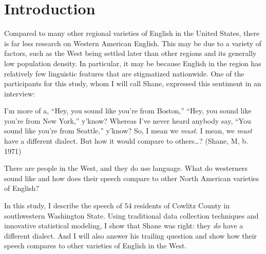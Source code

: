 \chapter{Introduction}
\label{ch:introduction}


Compared to many other regional varieties of English in the United States, there is far less research on Western American English. This may be due to a variety of factors, such as the West being settled later than other regions and its generally low population density. In particular, it may be because English in the region has relatively few linguistic features that are stigmatized nationwide. One of the participants for this study, whom I will call Shane, expressed this sentiment in an interview:
\begin{num_quote}
    I'm more of a, ``Hey, you sound like you're from Boston,'' ``Hey, you sound like you're from New York,'' y'know? Whereas I've never heard anybody say, ``You sound like you're from Seattle,'' y'know? So, I mean we \textit{must}. I mean, we \textit{must} have a different dialect. But how it would compare to others\ldots? (Shane, M, b. 1971)
\end{num_quote}
There are people in the West, and they do use language. What do westerners sound like and how does their speech compare to other North American varieties of English?

In this study, I describe the speech of 54 residents of Cowlitz County in southwestern Washington State. Using traditional data collection techniques and innovative statistical modeling, I show that Shane was right: they \textit{do} have a different dialect. And I will also answer his trailing question and show how their speech compares to other varieties of English in the West.

